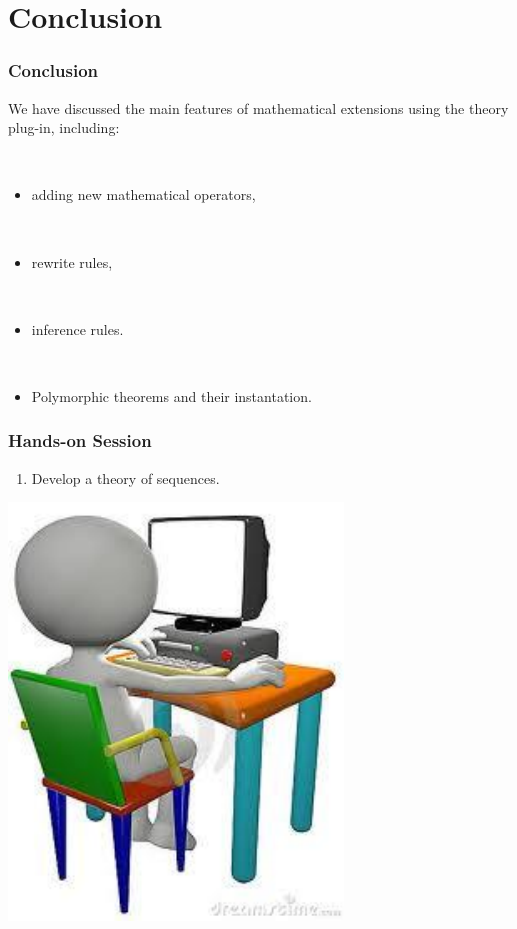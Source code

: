 \documentclass{beamer}
\begin{document}
\section{Conclusion}
	\begin{frame}
		\frametitle{Conclusion}
		We have discussed the main features of mathematical extensions using the theory plug-in, including:

~
		\begin{itemize}
 			\item adding new mathematical operators,

~
			\item rewrite rules,

~
			\item inference rules.

~
			\item Polymorphic theorems and their instantation.
		\end{itemize}
	\end{frame}
	\begin{frame}
		\frametitle{Hands-on Session}
		\begin{enumerate}
			\item Develop a theory of sequences.
		\end{enumerate}
		\begin{center}
			\includegraphics[scale=0.5]{Comp}
		\end{center}
	\end{frame}
\end{document}
